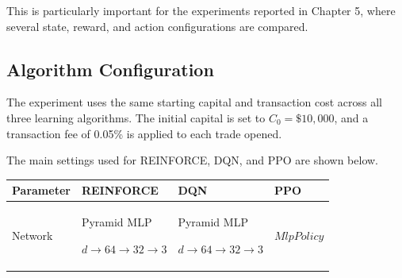 This is particularly important for the experiments reported in Chapter
5, where several state, reward, and action configurations are compared.

\subsection{Algorithm Configuration}

The experiment uses the same starting capital and transaction cost
across all three learning algorithms. The initial capital is set to
\(C_{0} = \$ 10,000\), and a transaction fee of 0.05\% is applied to
each trade opened.

The main settings used for REINFORCE, DQN, and PPO are shown below.

{\def\LTcaptype{none} %
\begin{longtable}[]{@{}
  >{\centering\arraybackslash}p{}
  >{\centering\arraybackslash}p{}
  >{\centering\arraybackslash}p{}
  >{\centering\arraybackslash}p{}@{}}
\toprule\noalign{}
\begin{minipage}[b]{\linewidth}\centering
\textbf{Parameter}
\end{minipage} & \begin{minipage}[b]{\linewidth}\centering
\textbf{REINFORCE}
\end{minipage} & \begin{minipage}[b]{\linewidth}\centering
\textbf{DQN}
\end{minipage} & \begin{minipage}[b]{\linewidth}\centering
\textbf{PPO}
\end{minipage} \\
\midrule\noalign{}
\endhead
\bottomrule\noalign{}
\endlastfoot
Network & Pyramid MLP

\(d \rightarrow 64 \rightarrow 32 \rightarrow 3\) & Pyramid MLP

\(d \rightarrow 64 \rightarrow 32 \rightarrow 3\) & \(MlpPolicy\)


\end{longtable}}
